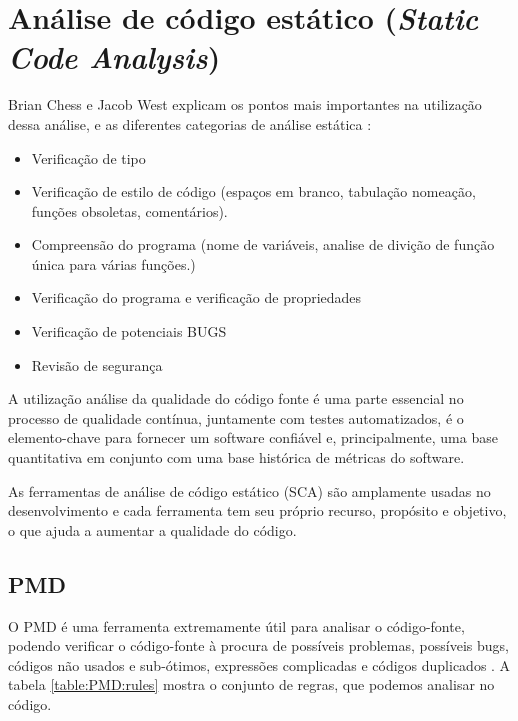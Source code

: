 \documentclass[12pt]{article}
\begin{document}
\section{Análise de código estático (\textit{Static Code Analysis})} \label{sec:staticcodeanalysis}
Brian Chess e Jacob West explicam \cite{SECURE_PROGRAMMING_STATIC_ANALYSIS} os pontos mais importantes na utilização dessa análise, e as diferentes categorias de análise estática :

\begin{itemize}
 \item Verificação de tipo
 \item Verificação de estilo de código (espaços em branco, tabulação nomeação, funções obsoletas, comentários).
 \item Compreensão do programa (nome de variáveis, analise de divição de função única para várias funções.)
 \item Verificação do programa e verificação de propriedades
 \item Verificação de potenciais BUGS
 \item Revisão de segurança
\end{itemize}

A utilização análise da qualidade do código fonte é uma parte essencial no processo de qualidade contínua, juntamente com testes automatizados, é o elemento-chave para fornecer um software confiável e, principalmente, uma base quantitativa em conjunto com uma base histórica de métricas do software.

As ferramentas de análise de código estático (SCA) são amplamente usadas no desenvolvimento \cite{SECURE_PROGRAMMING_STATIC_ANALYSIS} e cada ferramenta tem seu próprio recurso, propósito e objetivo, o que ajuda a aumentar a qualidade do código.

\subsection{PMD} \label{sec:pmd}
	O PMD é uma ferramenta extremamente útil para analisar o código-fonte, podendo verificar o código-fonte à procura de possíveis problemas, possíveis bugs, códigos não usados e sub-ótimos, expressões complicadas e códigos duplicados \cite{PMD}. A tabela \ref{table:PMD:rules} mostra o conjunto de regras, que podemos analisar no código.
\end{document}
